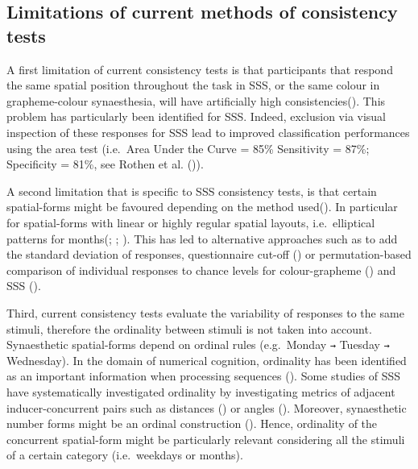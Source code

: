 \documentclass[
  man,
  floatsintext,
  longtable,
  a4paper,
  nolmodern,
  notxfonts,
  notimes,
  colorlinks=true,linkcolor=blue,citecolor=blue,urlcolor=blue]{apa7}
\begin{document}
\subsection{Limitations of current methods of consistency
tests}\label{limitations-of-current-methods-of-consistency-tests}

A first limitation of current consistency tests is that participants
that respond the same spatial position throughout the task in SSS, or
the same colour in grapheme-colour synaesthesia, will have artificially
high consistencies(). This
problem has particularly been identified for SSS. Indeed, exclusion via
visual inspection of these responses for SSS lead to improved
classification performances using the area test (i.e.~Area Under the
Curve = 85\% Sensitivity = 87\%; Specificity = 81\%, see Rothen et al.
()).

A second limitation that is specific to SSS consistency tests, is that
certain spatial-forms might be favoured depending on the method
used(). In particular for
spatial-forms with linear or highly regular spatial layouts,
i.e.~elliptical patterns for months(; ;
). This has led to
alternative approaches such as to add the standard deviation of
responses, questionnaire cut-off () or permutation-based comparison of individual responses to chance
levels for colour-grapheme ()
and SSS ().

Third, current consistency tests evaluate the variability of responses
to the same stimuli, therefore the ordinality between stimuli is not
taken into account. Synaesthetic spatial-forms depend on ordinal rules
(e.g.~Monday \texttt{→} Tuesday \texttt{→} Wednesday). In the domain of
numerical cognition, ordinality has been identified as an important
information when processing sequences (). Some studies of SSS have systematically investigated
ordinality by investigating metrics of adjacent inducer-concurrent pairs
such as distances () or
angles (). Moreover,
synaesthetic number forms might be an ordinal construction
(). Hence, ordinality of the
concurrent spatial-form might be particularly relevant considering all
the stimuli of a certain category (i.e.~weekdays or months).
\end{document}
